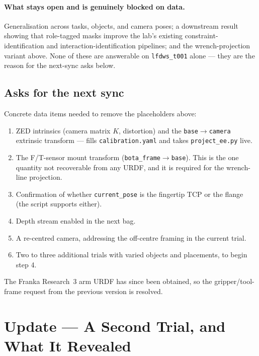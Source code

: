 \documentclass[11pt]{article}
\begin{document}
\paragraph{What stays open and is genuinely blocked on data.}
Generalisation across tasks, objects, and camera poses; a downstream
result showing that role-tagged masks improve the lab's existing
constraint-identification and interaction-identification pipelines; and
the wrench-projection variant above. None of these are answerable on
\texttt{lfdws\_t001} alone --- they are the reason for the next-sync asks
below.

\subsection{Asks for the next sync}

Concrete data items needed to remove the placeholders above:

\begin{enumerate}[noitemsep]
  \item ZED intrinsics (camera matrix $K$, distortion) and the
        \texttt{base}$\to$\texttt{camera} extrinsic transform --- fills
        \texttt{calibration.yaml} and takes \texttt{project\_ee.py} live.
  \item The F/T-sensor mount transform
        (\texttt{bota\_frame}$\to$\texttt{base}). This is the one quantity
        not recoverable from any URDF, and it is required for the
        wrench-line projection.
  \item Confirmation of whether \texttt{current\_pose} is the fingertip TCP
        or the flange (the script supports either).
  \item Depth stream enabled in the next bag.
  \item A re-centred camera, addressing the off-centre framing in the
        current trial.
  \item Two to three additional trials with varied objects and placements,
        to begin step 4.
\end{enumerate}

\noindent The Franka Research~3 arm URDF has since been obtained, so the
gripper/tool-frame request from the previous version is resolved.

\clearpage

\section{Update --- A Second Trial, and What It Revealed}
\end{document}
